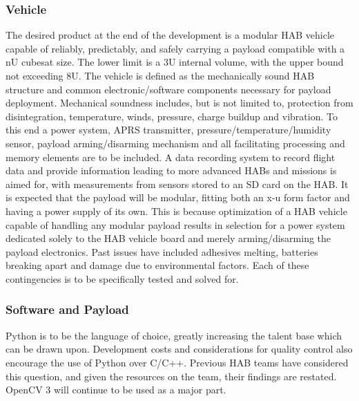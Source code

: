 \documentclass[conference]{IEEEtran} %
\begin{document}
\subsubsection{Vehicle}
\label{deliverables-vehicle}
The desired product at the end of the development is a modular HAB vehicle capable of reliably, predictably, and safely carrying a payload compatible with a nU cubesat size. The lower limit is a 3U internal volume, with the upper bound not exceeding 8U.
The vehicle is defined as the mechanically sound HAB structure and common electronic/software components necessary for payload deployment. 
Mechanical soundness includes, but is not limited to, protection from disintegration, temperature, winds, pressure, charge buildup and vibration.
To this end a power system, APRS transmitter, pressure/temperature/humidity sensor, payload arming/disarming mechanism and all facilitating processing and memory elements are to be included. 
A data recording system to record flight data and provide information leading to more advanced HABs and missions is aimed for, with measurements from sensors stored to an SD card on the HAB. 
It is expected that the payload will be modular, fitting both an x-u form factor and having a power supply of its own.
This is because optimization of a HAB vehicle capable of handling any modular payload results in selection for a power system dedicated solely to the HAB vehicle board and merely arming/disarming the payload electronics. 
Past issues have included adhesives melting, batteries breaking apart and damage due to environmental factors. Each of these contingencies is to be specifically tested and solved for.

\subsubsection{Software and Payload}
\label{deliverables-payload}
Python is to be the language of choice, greatly increasing the talent base which can be drawn upon. Development costs and considerations for quality control also encourage the use of Python over C/C++.
Previous HAB teams have considered this question, and given the resources on the team, their findings are restated. OpenCV 3 will continue to be used as a major part.
\end{document}
